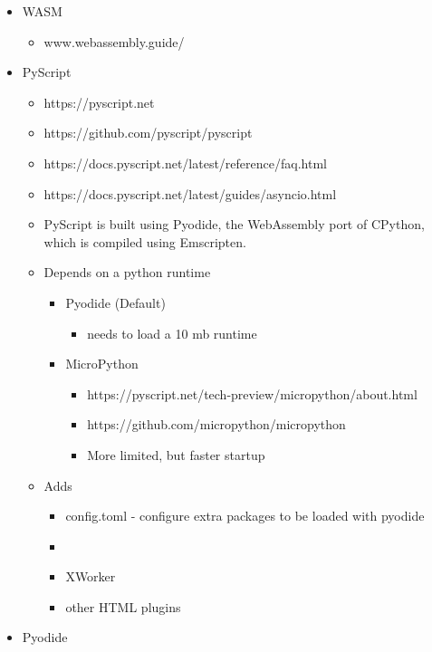 \begin{itemize}
\item
  WASM

  \begin{itemize}
  \tightlist
  \item
    www.webassembly.guide/
  \end{itemize}
\item
  PyScript

  \begin{itemize}
  \tightlist
  \item
    https://pyscript.net
  \item
    https://github.com/pyscript/pyscript
  \item
    https://docs.pyscript.net/latest/reference/faq.html
  \item
    https://docs.pyscript.net/latest/guides/asyncio.html
  \item
    PyScript is built using Pyodide, the WebAssembly port of CPython,
    which is compiled using Emscripten.
  \item
    Depends on a python runtime

    \begin{itemize}
    \tightlist
    \item
      Pyodide (Default)

      \begin{itemize}
      \tightlist
      \item
        needs to load a 10 mb runtime
      \end{itemize}
    \item
      MicroPython

      \begin{itemize}
      \tightlist
      \item
        https://pyscript.net/tech-preview/micropython/about.html
      \item
        https://github.com/micropython/micropython
      \item
        More limited, but faster startup
      \end{itemize}
    \end{itemize}
  \item
    Adds

    \begin{itemize}
    \item
      config.toml - configure extra packages to be loaded with pyodide
    \item
    \item
      XWorker
    \item
      other HTML plugins
    \end{itemize}
  \end{itemize}
\item
  Pyodide


\end{itemize}
